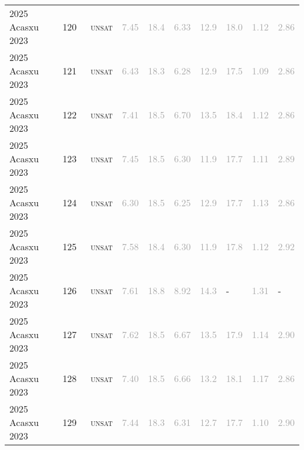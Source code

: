 \begin{center}
{\begin{longtable}{@{}llllllllll@{}}
2025 Acasxu 2023 & 120 & ~\textsc{unsat} & \textcolor{darkgray}{7.45} & \textcolor{darkgray}{18.4} & \textcolor{darkgray}{6.33} & \textcolor{darkgray}{12.9} & \textcolor{darkgray}{18.0} & \textcolor{darkgray}{1.12} & \textcolor{darkgray}{2.86} \\
2025 Acasxu 2023 & 121 & ~\textsc{unsat} & \textcolor{darkgray}{6.43} & \textcolor{darkgray}{18.3} & \textcolor{darkgray}{6.28} & \textcolor{darkgray}{12.9} & \textcolor{darkgray}{17.5} & \textcolor{darkgray}{1.09} & \textcolor{darkgray}{2.86} \\
2025 Acasxu 2023 & 122 & ~\textsc{unsat} & \textcolor{darkgray}{7.41} & \textcolor{darkgray}{18.5} & \textcolor{darkgray}{6.70} & \textcolor{darkgray}{13.5} & \textcolor{darkgray}{18.4} & \textcolor{darkgray}{1.12} & \textcolor{darkgray}{2.86} \\
2025 Acasxu 2023 & 123 & ~\textsc{unsat} & \textcolor{darkgray}{7.45} & \textcolor{darkgray}{18.5} & \textcolor{darkgray}{6.30} & \textcolor{darkgray}{11.9} & \textcolor{darkgray}{17.7} & \textcolor{darkgray}{1.11} & \textcolor{darkgray}{2.89} \\
2025 Acasxu 2023 & 124 & ~\textsc{unsat} & \textcolor{darkgray}{6.30} & \textcolor{darkgray}{18.5} & \textcolor{darkgray}{6.25} & \textcolor{darkgray}{12.9} & \textcolor{darkgray}{17.7} & \textcolor{darkgray}{1.13} & \textcolor{darkgray}{2.86} \\
2025 Acasxu 2023 & 125 & ~\textsc{unsat} & \textcolor{darkgray}{7.58} & \textcolor{darkgray}{18.4} & \textcolor{darkgray}{6.30} & \textcolor{darkgray}{11.9} & \textcolor{darkgray}{17.8} & \textcolor{darkgray}{1.12} & \textcolor{darkgray}{2.92} \\
2025 Acasxu 2023 & 126 & ~\textsc{unsat} & \textcolor{darkgray}{7.61} & \textcolor{darkgray}{18.8} & \textcolor{darkgray}{8.92} & \textcolor{darkgray}{14.3} & - & \textcolor{darkgray}{1.31} & - \\
2025 Acasxu 2023 & 127 & ~\textsc{unsat} & \textcolor{darkgray}{7.62} & \textcolor{darkgray}{18.5} & \textcolor{darkgray}{6.67} & \textcolor{darkgray}{13.5} & \textcolor{darkgray}{17.9} & \textcolor{darkgray}{1.14} & \textcolor{darkgray}{2.90} \\
2025 Acasxu 2023 & 128 & ~\textsc{unsat} & \textcolor{darkgray}{7.40} & \textcolor{darkgray}{18.5} & \textcolor{darkgray}{6.66} & \textcolor{darkgray}{13.2} & \textcolor{darkgray}{18.1} & \textcolor{darkgray}{1.17} & \textcolor{darkgray}{2.86} \\
2025 Acasxu 2023 & 129 & ~\textsc{unsat} & \textcolor{darkgray}{7.44} & \textcolor{darkgray}{18.3} & \textcolor{darkgray}{6.31} & \textcolor{darkgray}{12.7} & \textcolor{darkgray}{17.7} & \textcolor{darkgray}{1.10} & \textcolor{darkgray}{2.90} \\

\end{longtable}}
\end{center}

